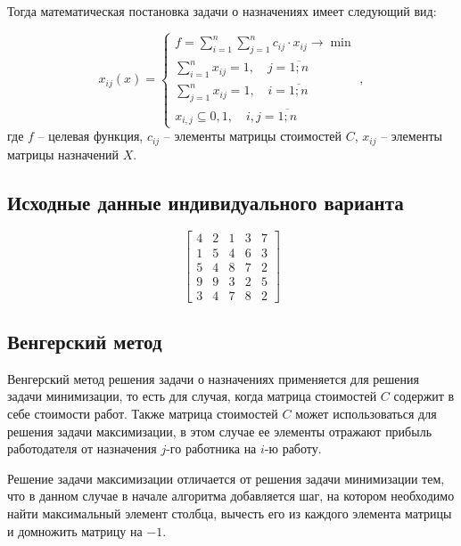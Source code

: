 \documentclass[a4paper,14pt]{article}
\begin{document}
Тогда математическая постановка задачи о назначениях имеет следующий вид:

\begin{equation}
x_{ij}(x) =
 \begin{cases}
   f=\sum\limits_{i=1}^n\sum\limits_{j=1}^n c_{ij} \cdot x_{ij} \rightarrow \min
   \\
   \sum\limits_{i=1}^n x_{ij} = 1, \quad j = \overline{1;n}
   \\
   \sum\limits_{j=1}^n x_{ij} = 1, \quad i = \overline{1;n}
   \\
   x_{i,j}\subseteq{0,1}, \quad i,j = \overline{1;n}
 \end{cases},  
\end{equation}
где $f$ -- целевая функция, $c_{ij}$ -- элементы матрицы стоимостей $C$, $x_{ij}$ -- элементы матрицы назначений $X$.

\subsection{Исходные данные индивидуального варианта}

\begin{equation}
\begin{bmatrix}
4 & 2 & 1 & 3 & 7\\
1 & 5 & 4 & 6 & 3\\
5 & 4 & 8 & 7 & 2\\
9 & 9 & 3 & 2 & 5\\
3 & 4 & 7 & 8 & 2
\end{bmatrix}
\end{equation}


\subsection{Венгерский метод}

Венгерский метод решения задачи о назначениях применяется для решения задачи минимизации, то есть для случая, когда матрица стоимостей $C$ содержит в себе стоимости работ. Также матрица стоимостей $C$ может использоваться для решения задачи максимизации, в этом случае ее элементы отражают прибыль работодателя от назначения $j$-го работника на $i$-ю работу. 

Решение задачи максимизации отличается от решения задачи минимизации тем, что в данном случае в начале алгоритма добавляется шаг, на котором необходимо найти максимальный элемент столбца, вычесть его из каждого элемента матрицы и домножить матрицу на $-1$.
\end{document}
